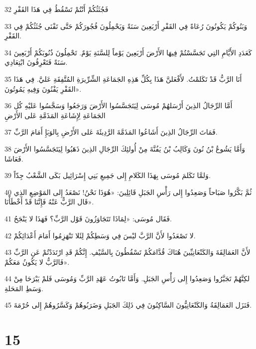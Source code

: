 \par 32 فَجُثَثُكُمْ أَنْتُمْ تَسْقُطُ فِي هَذَا القَفْرِ
\par 33 وَبَنُوكُمْ يَكُونُونَ رُعَاةً فِي القَفْرِ أَرْبَعِينَ سَنَةً وَيَحْمِلُونَ فُجُورَكُمْ حَتَّى تَفْنَى جُثَثُكُمْ فِي القَفْرِ.
\par 34 كَعَدَدِ الأَيَّامِ التِي تَجَسَّسْتُمْ فِيهَا الأَرْضَ أَرْبَعِينَ يَوْماً لِلسَّنَةِ يَوْمٌ. تَحْمِلُونَ ذُنُوبَكُمْ أَرْبَعِينَ سَنَةً فَتَعْرِفُونَ ابْتِعَادِي.
\par 35 أَنَا الرَّبُّ قَدْ تَكَلمْتُ. لأَفْعَلنَّ هَذَا بِكُلِّ هَذِهِ الجَمَاعَةِ الشِّرِّيرَةِ المُتَّفِقَةِ عَليَّ. فِي هَذَا القَفْرِ يَفْنُونَ وَفِيهِ يَمُوتُونَ».
\par 36 أَمَّا الرِّجَالُ الذِينَ أَرْسَلهُمْ مُوسَى لِيَتَجَسَّسُوا الأَرْضَ وَرَجَعُوا وَسَجَّسُوا عَليْهِ كُل الجَمَاعَةِ لِإِشَاعَةِ المَذَمَّةِ عَلى الأَرْضِ
\par 37 فَمَاتَ الرِّجَالُ الذِينَ أَشَاعُوا المَذَمَّةَ الرَّدِيئَةَ عَلى الأَرْضِ بِالوَبَإِ أَمَامَ الرَّبِّ.
\par 38 وَأَمَّا يَشُوعُ بْنُ نُونَ وَكَالِبُ بْنُ يَفُنَّةَ مِنْ أُولئِكَ الرِّجَالِ الذِينَ ذَهَبُوا لِيَتَجَسَّسُوا الأَرْضَ فَعَاشَا.
\par 39 وَلمَّا تَكَلمَ مُوسَى بِهَذَا الكَلامِ إِلى جَمِيعِ بَنِي إِسْرَائِيل بَكَى الشَّعْبُ جِدّاً.
\par 40 ثُمَّ بَكَّرُوا صَبَاحاً وَصَعِدُوا إِلى رَأْسِ الجَبَلِ قَائِلِينَ: «هُوَذَا نَحْنُ! نَصْعَدُ إِلى المَوْضِعِ الذِي قَال الرَّبُّ عَنْهُ فَإِنَّنَا قَدْ أَخْطَأْنَا».
\par 41 فَقَال مُوسَى: «لِمَاذَا تَتَجَاوَزُونَ قَوْل الرَّبِّ؟ فَهَذَا لا يَنْجَحُ.
\par 42 لا تَصْعَدُوا لأَنَّ الرَّبَّ ليْسَ فِي وَسَطِكُمْ لِئَلا تَنْهَزِمُوا أَمَامَ أَعْدَائِكُمْ.
\par 43 لأَنَّ العَمَالِقَةَ وَالكَنْعَانِيِّينَ هُنَاكَ قُدَّامَكُمْ تَسْقُطُونَ بِالسَّيْفِ. إِنَّكُمْ قَدِ ارْتَدَدْتُمْ عَنِ الرَّبِّ فَالرَّبُّ لا يَكُونُ مَعَكُمْ».
\par 44 لكِنَّهُمْ تَجَبَّرُوا وَصَعِدُوا إِلى رَأْسِ الجَبَلِ. وَأَمَّا تَابُوتُ عَهْدِ الرَّبِّ وَمُوسَى فَلمْ يَبْرَحَا مِنْ وَسَطِ المَحَلةِ.
\par 45 فَنَزَل العَمَالِقَةُ وَالكَنْعَانِيُّونَ السَّاكِنُونَ فِي ذَلِكَ الجَبَلِ وَضَرَبُوهُمْ وَكَسَّرُوهُمْ إِلى حُرْمَةَ.

\chapter{15}

